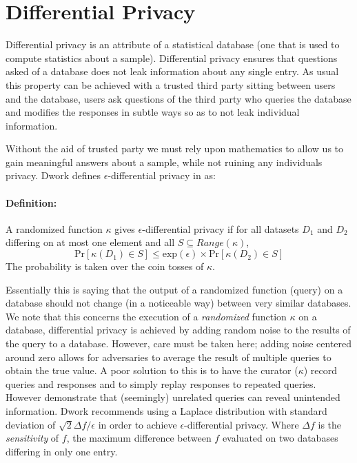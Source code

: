 \section{Differential Privacy}\label{sec:diff}
Differential privacy is an attribute of a statistical database (one that is used
to compute statistics about a sample). Differential privacy ensures
that questions asked of a database does not leak information about any single
entry. As usual this property can be achieved with a trusted third party sitting
between users and the database, users ask questions of the third party who
queries the database and modifies the responses in subtle ways so as to not leak
individual information.

Without the aid of trusted party we must rely upon mathematics to allow us to
gain meaningful answers about a sample, while not ruining any individuals
privacy. Dwork defines $\epsilon$-differential privacy in
\cite{dwork2008differential} as:

\paragraph{Definition:} A randomized function $\kappa$ gives
$\epsilon$-differential privacy if for all datasets $D_1$ and $D_2$ differing on
at most one element and all $S\subseteq Range(\kappa)$,
\[
    \text{Pr}[\kappa(D_1) \in S] \leq \text{exp}(\epsilon) \times 
    \text{Pr}[\kappa(D_2) \in S]
\]
The probability is taken over the coin tosses of $\kappa$.

Essentially this is saying that the output of a randomized function (query) on a
database should not change (in a noticeable way) between very similar databases.
We note that this concerns the execution of a \textit{randomized} function
$\kappa$ on a database, differential privacy is achieved by adding random noise
to the results of the query to a database. However, care must be taken here;
adding noise centered around zero allows for adversaries to average the result
of multiple queries to obtain the true value. A poor solution to this is to have
the curator ($\kappa$) record queries and responses and to simply replay
responses to repeated queries. However \cite{dinur2003revealing} demonstrate
that (seemingly) unrelated queries can reveal unintended information. Dwork
recommends using a Laplace distribution with standard deviation of
$\sqrt{2}\Delta f/\epsilon$ in order to achieve $\epsilon$-differential privacy.
Where $\Delta f$ is the \textit{sensitivity} of $f$, the maximum difference
between $f$ evaluated on two databases differing in only one entry.

